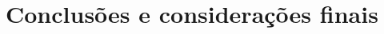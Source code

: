 \documentclass[12pt]{article}
\begin{document}
\section{Conclusões e considerações finais}




\end{document}

